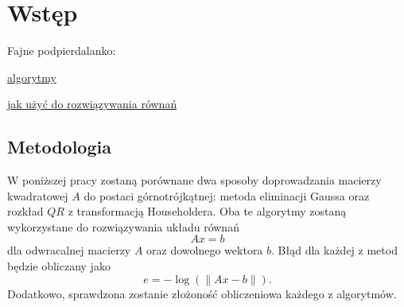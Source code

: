 \section{Wstęp}

Fajne podpierdalanko:

\href{https://people.inf.ethz.ch/gander/papers/qrneu.pdf}{algorytmy}

\href{https://inst.eecs.berkeley.edu/~ee127/sp21/livebook/l_lineqs_solving.html}{jak użyć do rozwiązywania równań}

\subsection{Metodologia}

W poniższej pracy zostaną porównane dwa sposoby doprowadzania macierzy kwadratowej $A$ do postaci górnotrójkątnej: metoda eliminacji Gaussa oraz rozkład $QR$ z transformacją Householdera. Oba te algorytmy zostaną wykorzystane do rozwiązywania układu równań 
$$Ax=b$$
dla odwracalnej macierzy $A$ oraz dowolnego wektora $b$. Błąd dla każdej z metod będzie obliczany jako
$$e=-\log(\|Ax-b\|).$$
Dodatkowo, sprawdzona zostanie złożoność obliczeniowa każdego z algorytmów.